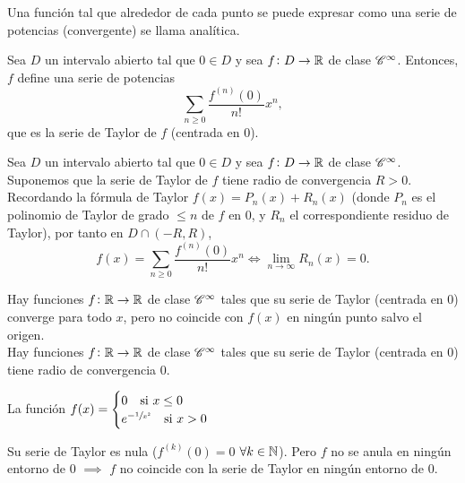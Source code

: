 \begin{defi}
    Una función tal que alrededor de cada punto se puede expresar como una serie
    de potencias (convergente) se llama analítica.
\end{defi}

\begin{defi}
    Sea $D$ un intervalo abierto tal que $0 \in D$ y sea $f \colon D \to \mathbb{R}$
    de clase $\mathscr{C}^\infty$. Entonces, $f$ define una serie de potencias
    \[
        \sum_{n \geq 0} \frac{f^{(n)}(0)}{n!} x^n,
    \]
    que es la serie de Taylor de $f$ (centrada en 0).
\end{defi}

\begin{prop}
    Sea $D$ un intervalo abierto tal que $0 \in D$ y sea $f \colon D \to \mathbb{R}$
    de clase $\mathscr{C}^\infty$. Suponemos que la serie de Taylor de $f$ tiene radio
    de convergencia $R > 0$. Recordando la fórmula de Taylor $f(x) = P_n(x) + R_n(x)$
    (donde $P_n$ es el polinomio de Taylor de grado $\leq n$ de $f$ en 0, y $R_n$
    el correspondiente residuo de Taylor), por tanto en $D \cap (-R,R)$,
    \[
        f(x) = \sum_{n \geq 0} \frac{f^{(n)}(0)}{n!}x^n \iff
        \lim_{n \to \infty} R_n(x) = 0.
    \]
\end{prop}

\begin{obs}
    Hay funciones $f \colon \mathbb{R} \to \mathbb{R}$ de clase $\mathscr{C}^\infty$ tales que su
    serie de Taylor (centrada en 0) converge para todo $x$, pero no coincide con
    $f(x)$ en ningún punto salvo el origen. \\
    Hay funciones $f \colon \mathbb{R} \to \mathbb{R}$ de clase $\mathscr{C}^\infty$ tales que su
    serie de Taylor (centrada en 0) tiene radio de convergencia 0.
\end{obs}

\begin{example}
    La función $f(x) = \begin{cases} 0 \quad \text{si } x \leq 0 \\
    e^{-\sfrac{1}{x^2}} \quad \text{si } x > 0 \end{cases}$
    \begin{center}
    \end{center}
    Su serie de Taylor es nula ($f^{(k)}(0) = 0$ $\forall k \in \mathbb{N}$). Pero $f$ no
    se anula en ningún entorno de 0 $\implies$ $f$ no coincide con la serie de
    Taylor en ningún entorno de 0.
\end{example}

